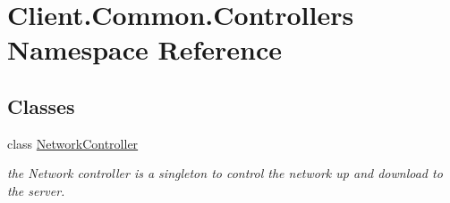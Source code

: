 \hypertarget{namespaceClient_1_1Common_1_1Controllers}{}\section{Client.\+Common.\+Controllers Namespace Reference}
\label{namespaceClient_1_1Common_1_1Controllers}
\subsection*{Classes}
\begin{DoxyCompactItemize}
\item 
class \hyperlink{classClient_1_1Common_1_1Controllers_1_1NetworkController}{Network\+Controller}
\begin{DoxyCompactList}\small\item\em the Network controller is a singleton to control the network up and download to the server. \end{DoxyCompactList}\end{DoxyCompactItemize}
